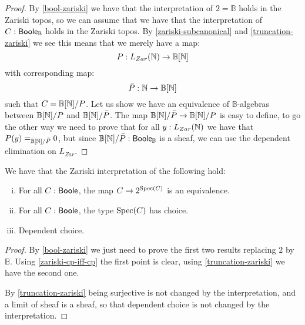 \begin{proof}
By \cref{bool-zariski} we have that the interpretation of ${2}=\mathbb{B}$ holds in the Zariski topos, so we can assume that we have that the interpretation of $C:\mathsf{Boole}_\mathbb{B}$ holds in the Zariski topos. By \cref{zariski-subcanonical} and \cref{truncation-zariski} we see this means that we merely have a map:
\[P:L_{Zar}(\mathbb{N})\to \mathbb{B}[\mathbb{N}]\]
with corresponding map:
\[\bar{P}:\mathbb{N}\to \mathbb{B}[\mathbb{N}]\]
such that $C =  \mathbb{B}[\mathbb{N}]/P$. Let us show we have an equivalence of $\mathbb{B}$-algebras between $ \mathbb{B}[\mathbb{N}]/P$ and $\mathbb{B}[\mathbb{N}]/\bar{P}$. The map $\mathbb{B}[\mathbb{N}]/\bar{P}\to \mathbb{B}[\mathbb{N}]/P$ is easy to define, to go the other way we need to prove that for all $y:L_{Zar}(\mathbb{N})$ we have that $P(y) =_{\mathbb{B}[\mathbb{N}]/\bar{P}} 0$, but since $\mathbb{B}[\mathbb{N}]/\bar{P}:\mathsf{Boole}_\mathbb{B}$ is a sheaf, we can use the dependent elimination on $L_{Zar}$.
\end{proof}

\begin{theorem}\label{zariski-sheaf-axioms}
We have that the Zariski interpretation of the following hold:
\begin{enumerate}[(i)]
\item For all $C:\mathsf{Boole}$, the map $C\to {2}^{\operatorname{Spec}(C)}$ is an equivalence.
\item For all $C:\mathsf{Boole}$, the type $\operatorname{Spec}(C)$ has choice.
\item Dependent choice.
\end{enumerate}
\end{theorem}

\begin{proof}
By \cref{bool-zariski} we just need to prove the first two results replacing ${2}$ by $\mathbb{B}$. Using \cref{zariski-cp-iff-cp} the first point is clear, using \cref{truncation-zariski} we have the second one.

By \cref{truncation-zariski} being surjective is not changed by the interpretation, and a limit of sheaf is a sheaf, so that dependent choice is not changed by the interpretation.
\end{proof}


